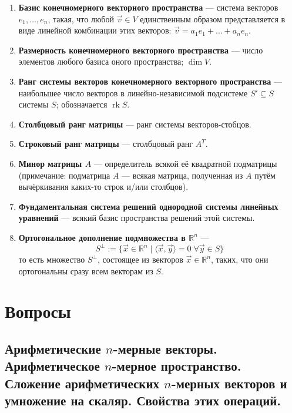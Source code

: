\documentclass[a4paper, 12pt]{article}
\DeclareMathOperator{\rk}{rk}
\begin{document}
\begin{enumerate}
\item \textbf{Базис конечномерного векторного пространства} — система векторов $e_1, \ldots, e_n$, такая, что любой $\vec{v} \in V$ единственным образом представляется в виде линейной комбинации этих векторов: $\vec{v} = a_1 e_1 + \ldots + a_n e_n$.

\item \textbf{Размерность конечномерного векторного пространства} — число элементов любого базиса оного пространства; $\dim{V}$.

\item \textbf{Ранг системы векторов конечномерного векторного пространства} — наибольшее число векторов в линейно-независимой подсистеме $S'\subseteq S$ системы $S$; обозначается $\rk{S}$.

\item \textbf{Столбцовый ранг матрицы} — ранг системы векторов-стобцов.

\item \textbf{Строковый ранг матрицы} — столбцовый ранг $A^T$.

\item \textbf{Минор матрицы $A$} — определитель всякой её квадратной подматрицы (примечание: подматрица $A$ --- всякая матрица, полученная из $A$ путём вычёркивания каких-то строк и/или столбцов).

\item \textbf{Фундаментальная система решений однородной системы линейных уравнений} — всякий базис пространства решений этой системы.

\item \textbf{Ортогональное дополнение подмножества в $\mathbb{R}^n$} — \[S^\perp \mathrel{:=} \{\vec x \in \mathbb{R}^n \mid \langle \vec{x}, \vec{y} \rangle =0\; \forall \vec y \in S\}\] то есть множество $S^\perp$, состоящее из векторов $\vec x \in \mathbb{R}^n$, таких, что они ортогональны сразу всем векторам из $S$.

\end{enumerate}

\newpage
\section{Вопросы}
\subsection{Арифметические $n$-мерные векторы. Арифметическое $n$-мер\-ное пространство. Сложение арифметических $n$-мерных векторов и умножение на скаляр. Свойства этих операций.}
\end{document}
